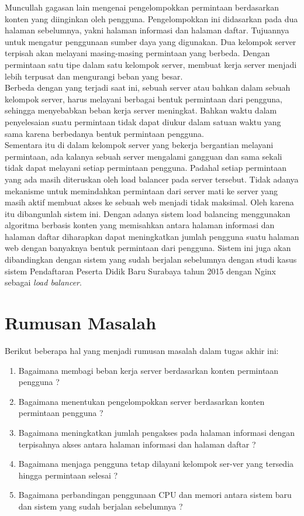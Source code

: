 \documentclass{ta-its}
\begin{document}
			\indent Muncullah gagasan lain mengenai pengelompokkan permintaan berdasarkan konten yang diinginkan oleh pengguna. Pengelompokkan ini didasarkan pada dua halaman sebelumnya, yakni halaman informasi dan halaman daftar. Tujuannya untuk mengatur penggunaan sumber daya yang digunakan. Dua kelompok server terpisah akan melayani masing-masing permintaan yang berbeda. Dengan permintaan satu tipe dalam satu kelompok server, membuat kerja server menjadi lebih terpusat dan mengurangi beban yang besar. \\
			\indent Berbeda dengan yang terjadi saat ini, sebuah server atau bahkan dalam sebuah kelompok server, harus melayani berbagai bentuk permintaan dari pengguna, sehingga menyebabkan beban kerja server meningkat. Bahkan waktu dalam penyelesaian suatu permintaan tidak dapat diukur dalam satuan waktu yang sama karena berbedanya bentuk permintaan pengguna. \\
			\indent Sementara itu di dalam kelompok server yang bekerja bergantian melayani permintaan, ada kalanya sebuah server mengalami gangguan dan sama sekali tidak dapat melayani setiap permintaan pengguna. Padahal setiap permintaan yang ada masih diteruskan oleh load balancer pada server tersebut. Tidak adanya mekanisme untuk memindahkan permintaan dari server mati ke server yang masih aktif membuat akses ke sebuah web menjadi tidak maksimal.
			Oleh karena itu dibangunlah sistem ini. Dengan adanya sistem load balancing menggunakan algoritma berbasis konten yang memisahkan antara halaman informasi dan halaman daftar diharapkan dapat meningkatkan jumlah pengguna suatu halaman web dengan banyaknya bentuk permintaan dari pengguna. Sistem ini juga akan dibandingkan dengan sistem yang sudah berjalan sebelumnya dengan studi kasus sistem Pendaftaran Peserta Didik Baru Surabaya tahun 2015 dengan Nginx sebagai \textit{load balancer}.

            
        \section{Rumusan Masalah}
			Berikut beberapa hal yang menjadi rumusan masalah dalam tugas akhir ini:
			\begin{enumerate}
			\item Bagaimana membagi beban kerja server berdasarkan konten permintaan pengguna ?
			\item Bagaimana menentukan pengelompokkan server berdasarkan konten permintaan pengguna ?
			\item Bagaimana meningkatkan jumlah pengakses pada halaman informasi dengan terpisahnya akses antara halaman informasi dan halaman daftar ?
			\item Bagaimana menjaga pengguna tetap dilayani kelompok ser-ver yang tersedia hingga permintaan selesai ?
			\item Bagaimana perbandingan penggunaan CPU dan memori antara sistem baru dan sistem yang sudah berjalan sebelumnya ?
			\end{enumerate}
\end{document}
